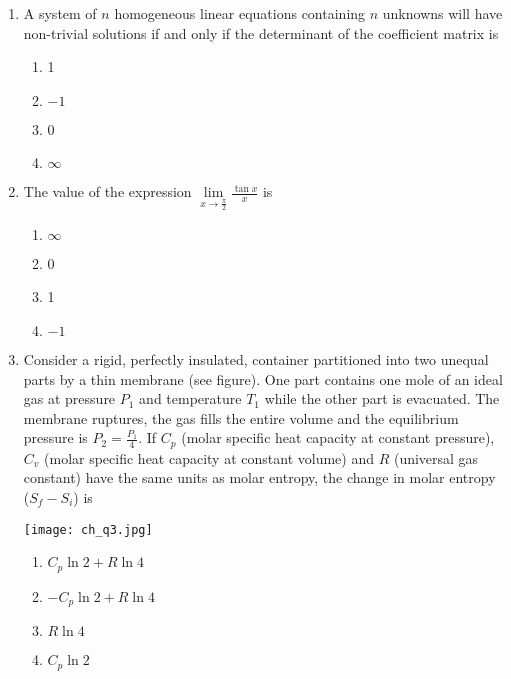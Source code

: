 \documentclass[12pt]{article}
\begin{document}
\begin{enumerate}[label=Q.\arabic*]

	\item A system of $n$ homogeneous linear equations containing $n$ unknowns will have non-trivial solutions if and only if the determinant of the coefficient matrix is
		\begin{multicols}{2}
			\begin{enumerate}[label=(\Alph*)]
				\item 1
				\item $-1$
				\item 0
				\item $\infty$
			\end{enumerate}
		\end{multicols}

	\item The value of the expression $\lim\limits_{x \to \frac{\pi}{2}} \frac{\tan x}{x}$ is
		\begin{multicols}{2}
			\begin{enumerate}[label=(\Alph*)]
				\item $\infty$
				\item 0
				\item 1
				\item $-1$
			\end{enumerate}
		\end{multicols}

	\item Consider a rigid, perfectly insulated, container partitioned into two unequal parts by a thin membrane (see figure). One part contains one mole of an ideal gas at pressure $P_1$ and temperature $T_1$ while the other part is evacuated. The membrane ruptures, the gas fills the entire volume and the equilibrium pressure is $P_2 = \frac{P_1}{4}$. If $C_p$ (molar specific heat capacity at constant pressure), $C_v$ (molar specific heat capacity at constant volume) and $R$ (universal gas constant) have the same units as molar entropy, the change in molar entropy ($S_f - S_i$) is
		\begin{center}
			{
				\texttt{[image: ch\_q3.jpg]}
			}
		\end{center}
		\begin{multicols}{2}
			\begin{enumerate}[label=(\Alph*)]
				\item $C_p \ln 2 + R \ln 4$
				\item $-C_p \ln 2 + R \ln 4$
				\item $R \ln 4$
				\item $C_p \ln 2$
			\end{enumerate}
		\end{multicols}


\end{enumerate}
\end{document}
